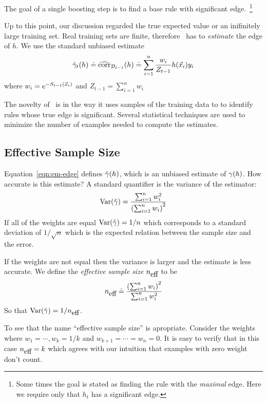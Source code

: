 The goal of a single boosting step is to find a base rule with
significant edge.~\footnote{Some times the goal is stated as
  finding the rule with the {\em maximal} edge.  Here we require only
  that $h_t$ has a significant edge.}

Up to this point, our discussion regarded the true expected value or
an inifinitely large training set. Real training sets are finite, 
therefore \Sparrow\ has to {\em
  estimate} the edge of $h$. We use the standard unbiased estimate
\begin{equation} \label{eqn:emp-edge}
\hat{\gamma}_{t}(h) \doteq \widehat{\mbox{corr}}_{{\cal D}_{t-1}}(h)
\doteq 
\sum_{i=1}^n \frac{w_i}{Z_{t-1}} h(\vec{x}_i) y_i
\end{equation}
where  $w_i = e^{-S_{t-1}(\vec{x}_i)}$ and $Z_{t-1} = \sum_{i=1}^n w_i$

The novelty of \Sparrow\ is in the way it uses samples of the training
data to to identify rules whose true edge is significant.
Several statistical techniques are used to minimize the number of
examples needed to compute the estimates.

\subsection{Effective Sample Size}
\label{sec:effectiveSampleSize}
Equation~\ref{eqn:em-edge} defines $\hat{\gamma}(h)$, which is an
unbiased estimate of $\gamma(h)$. How accurate is this estimate? A
standard quantifier is the variance of the estimator:
\begin{equation} \label{eqn:variance}
 \mbox{Var}(\hat{\gamma}) = \frac{\sum_{i=1}^n w_i^2}{\left(\sum_{i=1}^n w_i\right)^2}
\end{equation}
If all of the weights are equal $\mbox{Var}(\hat{\gamma}) = 1/n$ which
corresponds to a standard deviation of $1/\sqrt{n}$ which is the
expected relation between the sample size and the error.

If the weights are not equal then the variance is larger and the
estimate is less accurate. We define the {\em effective sample size}
${n_{\mbox{eff}}}$ to be
\begin{equation} \label{eqn:neff}
  {n_{\mbox{eff}}} \doteq \frac{\left(\sum_{i=1}^n w_i\right)^2}{\sum_{i=1}^n w_i^2}
\end{equation}
So that $\mbox{Var}(\hat{\gamma}) = 1/{n_{\mbox{eff}}}$.

To see that the name ``effective sample size'' is apropriate. Consider
the weights where $w_1=\cdots,w_k=1/k$ and
$w_{k+1}=\cdots=w_{n}=0$. It is easy to verify that in this case
${n_{\mbox{eff}}}=k$ which agrees with our intuition that examples with zero
weight don't count.

